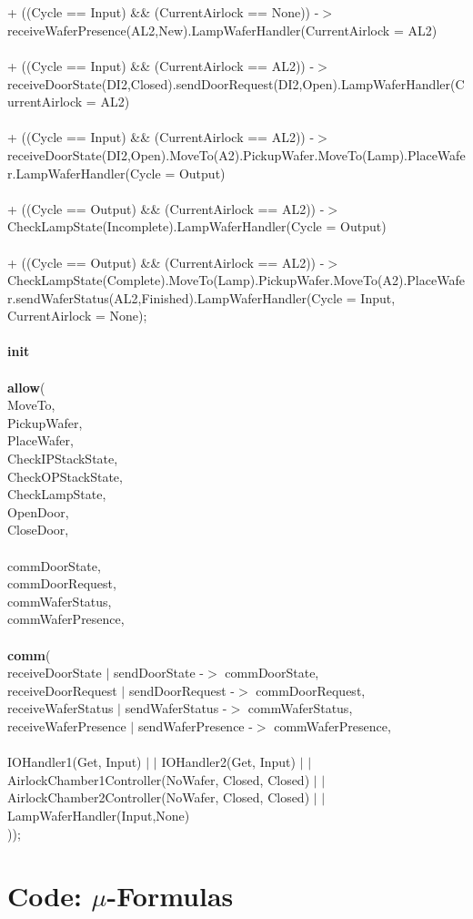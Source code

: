 \documentclass[a4paper,12pt]{article}
\begin{document}
\\
\\+ ((Cycle == Input) \&\& (CurrentAirlock == None)) -$>$ receiveWaferPresence(AL2,New).LampWaferHandler(CurrentAirlock = AL2)
\\
\\+ ((Cycle == Input) \&\& (CurrentAirlock == AL2)) -$>$ receiveDoorState(DI2,Closed).sendDoorRequest(DI2,Open).LampWaferHandler(CurrentAirlock = AL2)
\\
\\+ ((Cycle == Input) \&\& (CurrentAirlock == AL2)) -$>$ receiveDoorState(DI2,Open).MoveTo(A2).PickupWafer.MoveTo(Lamp).PlaceWafer.LampWaferHandler(Cycle = Output)
\\
\\+ ((Cycle == Output) \&\& (CurrentAirlock == AL2)) -$>$ CheckLampState(Incomplete).LampWaferHandler(Cycle = Output)
\\
\\+ ((Cycle == Output) \&\& (CurrentAirlock == AL2)) -$>$ CheckLampState(Complete).MoveTo(Lamp).PickupWafer.MoveTo(A2).PlaceWafer.sendWaferStatus(AL2,Finished).LampWaferHandler(Cycle = Input, CurrentAirlock = None);
\\
\\\textbf{init} 
\\
\\\textbf{			allow}(
\\						{MoveTo,
 \\ 				 	 PickupWafer,
 \\				 		 PlaceWafer,
 \\	    			 CheckIPStackState,
\\	  				 CheckOPStackState,
\\						 CheckLampState,
\\						 OpenDoor,
\\						 CloseDoor,
\\
\\						 commDoorState,
\\						 commDoorRequest,
\\						 commWaferStatus,
\\						 commWaferPresence},
\\
\\\textbf{			comm}(
\\						{receiveDoorState $|$ sendDoorState -$>$ commDoorState,
\\						receiveDoorRequest $|$ sendDoorRequest -$>$ commDoorRequest,
\\	  				 	receiveWaferStatus $|$ sendWaferStatus -$>$ commWaferStatus,
\\				 	   receiveWaferPresence $|$ sendWaferPresence -$>$ commWaferPresence},
\\
\\						 IOHandler1(Get, Input) $|$ $|$ IOHandler2(Get, Input) $|$ $|$ AirlockChamber1Controller(NoWafer, Closed, Closed) $|$ $|$ AirlockChamber2Controller(NoWafer, Closed, Closed) $|$ $|$ LampWaferHandler(Input,None)
\\					 ));
\newpage
\section{Code: $\mu$-Formulas}
\end{document}
